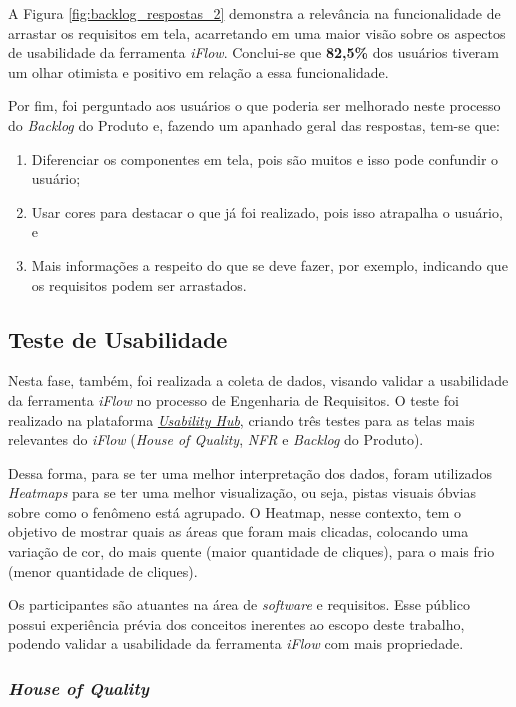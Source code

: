 A Figura \ref{fig:backlog_respostas_2} demonstra a relevância na funcionalidade de arrastar os requisitos em tela, acarretando em uma maior visão sobre os aspectos de usabilidade da ferramenta \textit{iFlow}. Conclui-se que \textbf{82,5\%} dos usuários tiveram um olhar otimista e positivo em relação a essa funcionalidade.

Por fim, foi perguntado aos usuários o que poderia ser melhorado neste processo do \textit{Backlog} do Produto e, fazendo um apanhado geral das respostas, tem-se que:

\begin{enumerate}
    \item Diferenciar os componentes em tela, pois são muitos e isso pode confundir o usuário;
    \item Usar cores para destacar o que já foi realizado, pois isso atrapalha o usuário, e
    \item Mais informações a respeito do que se deve fazer, por exemplo, indicando que os requisitos podem ser arrastados.
\end{enumerate}

\subsection{Teste de Usabilidade}
Nesta fase, também, foi realizada a coleta de dados, visando validar a usabilidade da ferramenta \textit{iFlow} no processo de Engenharia de Requisitos. O teste foi realizado na plataforma \href{https://usabilityhub.com/}{\textit{Usability Hub}}, criando três testes para as telas mais relevantes do \textit{iFlow} (\textit{House of Quality}, \textit{NFR} e \textit{Backlog} do Produto).

Dessa forma, para se ter uma melhor interpretação dos dados, foram utilizados \textit{Heatmaps} para se ter uma melhor visualização, ou seja, pistas visuais óbvias sobre como o fenômeno está agrupado. O Heatmap, nesse contexto, tem o objetivo de mostrar quais as áreas que foram mais clicadas, colocando uma variação de cor, do mais quente (maior quantidade de cliques), para o mais frio (menor quantidade de cliques).

Os participantes são atuantes na área de \textit{software} e requisitos. Esse público possui experiência prévia dos conceitos inerentes ao escopo deste trabalho, podendo validar a usabilidade da ferramenta \textit{iFlow} com mais propriedade.

\subsubsection{\textit{House of Quality}}

